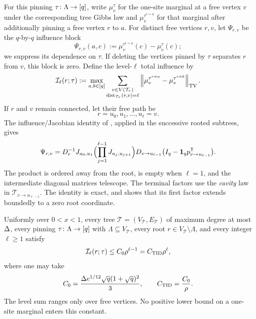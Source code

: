 For this pinning \(\tau\colon\Lambda\to[q]\), write
\(\mu_v^\tau\) for the one-site marginal
at a free vertex \(v\) under the corresponding tree Gibbs law and
\(\mu_v^{\tau^{r=a}}\) for that marginal after additionally pinning a free
vertex \(r\) to \(a\).  For distinct free vertices \(r,v\), let
\(\Psi_{r,v}\) be the \(q\)-by-\(q\) influence block
\[
 \Psi_{r,v}(a,c)
 :=\mu_v^{\tau^{r=a}}(c)-\mu_v^\tau(c);
\]
we suppress its dependence on \(\tau\).  If deleting the vertices pinned by
\(\tau\) separates \(r\) from \(v\), this block is zero.  Define the
level-\(\ell\) total influence by
\begin{equation}
 \mathcal I_\ell(r;\tau)
 :=\max_{a,b\in[q]}
   \sum_{\substack{v\in V(\mathcal T_\tau)\\
                   \operatorname{dist}_{\mathcal T_\tau}(r,v)=\ell}}
   \left\|\mu_v^{\tau^{r=a}}-\mu_v^{\tau^{r=b}}\right\|_{\rm TV}.
 \label{eq:hg-tid-definition}
\end{equation}
If \(r\) and \(v\) remain connected, let their free path be
\[
  r=u_0,u_1,\ldots,u_\ell=v.
\]
The influence/Jacobian identity of \cite[Lemma~8.7]{CLMM2023}, applied in
the successive rooted subtrees, gives
\begin{equation}
  \Psi_{r,v}
   =D_r^{-1}J_{u_0,u_1}
      \Bigl(\prod_{j=1}^{\ell-1}J_{u_j,u_{j+1}}\Bigr)
      D_{v\to u_{\ell-1}}
      \bigl(I_q-\mathbf1_qp_{v\to u_{\ell-1}}^{\mathsf T}\bigr).
  \label{eq:hg-psi-factorization}
\end{equation}
The product is ordered away from the root, is empty when \(\ell=1\), and
the intermediate diagonal matrices telescope.  The terminal factors use
the \emph{cavity} law in
\(\mathcal T_{v\to u_{\ell-1}}\).  The identity is exact, and
 shows that its first factor extends boundedly
to a zero root coordinate.

\begin{lemma}
\label{lem:hg-tid}
Uniformly over $0<x<1$, every tree
\(\mathcal T=(V_{\mathcal T},E_{\mathcal T})\) of maximum degree at most
\(\Delta\), every pinning \(\tau\colon\Lambda\to[q]\) with
\(\Lambda\subseteq V_{\mathcal T}\), every root
\(r\in V_{\mathcal T}\setminus\Lambda\), and every integer $\ell\ge1$ satisfy
\begin{equation}
 \mathcal I_\ell(r;\tau)
 \le C_0\rho^{\ell-1}
 =C_{\rm TID}\rho^\ell,
\label{eq:hg-tid}
\end{equation}
where one may take
\begin{equation}
 C_0=\frac{\Delta e^{1/12}\sqrt q(1+\sqrt q)^2}{3},
 \qquad
 C_{\rm TID}=\frac{C_0}{\rho}.
 \label{eq:hg-tid-constant}
\end{equation}
The level sum ranges only over free vertices.
No positive lower bound on a one-site marginal enters this constant.
\end{lemma}

